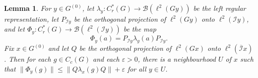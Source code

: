\documentclass[a4paper, 12pt]{amsart}
\theoremstyle{plain}
\newtheorem{lemma}[theorem]{Lemma}
\theoremstyle{definition}
\theoremstyle{remark}
\newcommand{\Bb}{\mathcal{B}}
\newcommand{\Ii}{\mathcal{I}}
\newcommand{\Iicl}{\overline{\mathcal{I}}}
\numberwithin{equation}{section}
\begin{document}
\begin{lemma}\label{lem:sheesh}
For $y \in
G^{(0)}$, let $\lambda_y \colon C^*_r(G) \to \Bb(\ell^2(Gy))$ be the left regular
representation, let $P_{\Ii y}$ be the orthogonal projection of $\ell^2(Gy)$ onto
$\ell^2(\Ii y)$, and let $\Phi_y \colon C^*_r(G) \to
\Bb(\ell^2(\Ii y))$ be the map
\begin{equation}\label{eq:def Phi_y}
\Phi_y(a) = P_{\Ii y} \lambda_y(a) P_{\Ii y}.
\end{equation}
Fix $x \in G^{(0)}$ and let $Q$ be the orthogonal projection of $\ell^2(Gx)$ onto
$\ell^2(\Iicl x)$. Then for each $g \in C_c(G)$ and each $\varepsilon >
0$, there is a neighbourhood $U$ of $x$ such that $\|\Phi_y(g)\| \le \|Q
\lambda_x(g) Q\| + \varepsilon$ for all $y \in U$.
\end{lemma}
\end{document}

